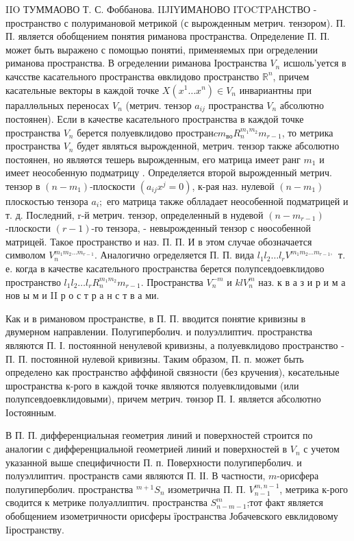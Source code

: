 \documentclass[10pt]{article}
\begin{document}
IIO ТУММАОВО Т. С. Фоббанова. IIJIYИМАНОВО ITOCTPAНСТВО - пространство с полуримановой метрикой (с вырожденным метрич. тензором). П. П. является обобщением понятия риманова пространства. Определение П. П. может быть выражено с помощью понятиі, применяемых при огределении риманова пространства. В огределении риманова Іространства $V_{n}$ исшоль'уется в качсстве касательного пространства өвклидово пространство $\mathbb{R}^{n}$, причем касательные векторы в каждой точке $X\left(x^{1} \ldots x^{n}\right) \in V_{n}$ инвариантны при параллөльных переносах $V_{n}$ (метрич. тензор $a_{i j}$ пространства $V_{n}$ абсолютно постоянен). Если в качестве касательного пространства в каждой точке пространства $V_{n}$ берется полуевклидово простран$c m_{в о} R_{n}^{m_{1} m_{2}} m_{r-1}$, то метрика пространства $V_{n}$ будет являться вырожденной, метрич. тензор также абсолютно постоянен, но являөтся тешерь вырожденным, его матрица имеет ранг $m_{1}$ и имеет неособенную подматрицу . Определяется второй вырожденный метрич. тензор в $\left(n-m_{1}\right)$-плоскости $\left(a_{i j} x^{j}=0\right)$, к-рая наз. нулевой $\left(n-m_{1}\right)$ плоскостью тензора $a_{i} ;$ его матрица также облладает неособенной подматрицей и т. д. Последний, r-й метрич. тензор, определенный в нудевой $\left(n-m_{r-1}\right)$-плоскости $(r-1)$-го тензора, - невырожденный тензор с нөособенной матрицей. Такое пространство и наз. П. П. И в этом случае обозначается символом $V_{n}^{m_{1} m_{2} \ldots m_{r-1}}$. Аналогично огределяется П. П. вида $l_{1} l_{2} \ldots l_{r} V^{m_{1} m_{2} \ldots m_{r-1} \text {, }}$ т. е. когда в качестве касательного пространства берется полупсевдоевклидово пространство $l_{1} l_{2} \ldots l_{r} R_{n}^{m_{1} m_{2}} m_{r-1}$. Пространства $V_{n}^{-m}$ и $k l V_{n}^{m}$ наз. к в а з и р и м а нов ы м и II р о с т р а н с т в а ми.



Как и в римановом пространстве, в П. П. вводится понятие кривизны в двумерном направлении. Полугиперболич. и полуэллиптич. пространства являются П. І. постоянной ненулевой кривизны, а полуевклидово пространство - П. П. постоянной нулевой кривизны. Таким образом, П. п. может быть определено как пространство афффиной связности (без кручения), көсательные шространства к-рого в каждой точке являются полуевклидовыми (или полупсевдоевклидовыми), причем метрич. төнзор П. І. является абсолютно Іостоянным.



В П. П. дифференциальная геометрия линий и поверхностей строится по аналогии с дифференциальной геометрией линий и поверхностей в $V_{n}$ с учетом указанной выше специфичности П. п. Поверхности полугиперболич. и полуэллиптич. пространств сами являются П. ІІ. В частности, $m$-орисфера полугиперболич. пространства ${ }^{m+1} S_{n}$ изометрична П. П. $V_{n-1}^{m, n-1}$, метрика к-рого сводится к метрике полуәллиптич. пространства $S_{n-m-1}^{m}$;тот факт является обобщением изометричности орисферы їространства Јобачевского евклидовому Iіространству.
\end{document}
